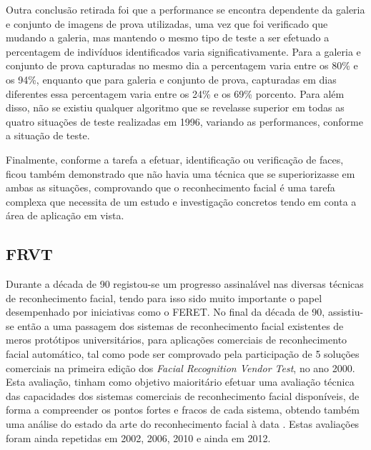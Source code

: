 Outra conclusão retirada foi que a performance se encontra dependente da galeria e conjunto de imagens de prova utilizadas, uma vez que foi verificado que mudando a galeria, mas mantendo o mesmo tipo de teste a ser efetuado a percentagem de indivíduos identificados varia significativamente. Para a galeria e conjunto de prova capturadas no mesmo dia a percentagem varia entre os 80\% e os 94\%, enquanto que para galeria e conjunto de prova, capturadas em dias diferentes essa percentagem varia entre os 24\% e os 69\% porcento. Para além disso, não se existiu qualquer algoritmo que se revelasse superior em todas as quatro situações de teste realizadas em 1996, variando as performances, conforme a situação de teste.

Finalmente, conforme a tarefa a efetuar, identificação ou verificação de faces, ficou também demonstrado que não havia uma técnica que se superiorizasse em ambas as situações, comprovando que o reconhecimento facial é uma tarefa complexa que necessita de um estudo e investigação concretos tendo em conta a área de aplicação em vista.

\subsection{FRVT}
Durante a década de 90 registou-se um progresso assinalável nas diversas técnicas de reconhecimento facial, tendo para isso sido muito importante o papel desempenhado por iniciativas como o FERET. No final da década de 90, assistiu-se então a uma passagem dos sistemas de reconhecimento facial existentes de meros protótipos universitários, para aplicações comerciais de reconhecimento facial automático, tal como pode ser comprovado  pela participação de 5 soluções comerciais na primeira edição dos \textit{Facial Recognition Vendor Test}, no ano 2000. Esta avaliação, tinham como objetivo maioritário efetuar uma avaliação técnica das capacidades dos sistemas comerciais de reconhecimento facial disponíveis, de forma a compreender os pontos fortes e fracos de cada sistema, obtendo também uma análise do estado da arte do reconhecimento facial à data \cite{BlackburnDuaneM.;BoneMike;Phillips2001}. Estas avaliações foram ainda repetidas em 2002, 2006, 2010 e ainda em 2012.

